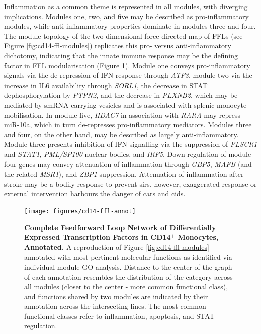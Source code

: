Inflammation as a common theme is represented in all modules, with diverging implications. Modules one, two, and five may be described as pro-inflammatory modules, while anti-inflammatory properties dominate in modules three and four. The module topology of the two-dimensional force-directed map of FFLs (see Figure \ref{fig:cd14-ffl-modules}) replicates this pro- versus anti-inflammatory dichotomy, indicating that the innate immune response may be the defining factor in FFL modularisation (Figure \ref{fig:cd14-ffl-annot}). Module one conveys pro-inflammatory signals via the de-repression of IFN response through \emph{ATF3}, module two via the increase in IL6 availability through \emph{SORL1}, the decrease in STAT dephosphorylation by \emph{PTPN2}, and the decrease in \emph{PLXNB2}, which may be mediated by smRNA-carrying vesicles and is associated with splenic monocyte mobilisation. In module five, \emph{HDAC7} in association with \emph{RARA} may repress miR-10a, which in turn de-represses pro-inflammatory mediators. Modules three and four, on the other hand, may be described as largely anti-inflammatory. Module three presents inhibition of IFN signalling via the suppression of \emph{PLSCR1} and \emph{STAT1}, \emph{PML/SP100} nuclear bodies, and \emph{IRF5}. Down-regulation of module four genes may convey attenuation of inflammation through \emph{GBP5}, \emph{MAFB} (and the related \emph{MSR1}), and \emph{ZBP1} suppression. Attenuation of inflammation after stroke may be a bodily response to prevent \acf{sirs}, however, exaggerated response or external intervention harbours the danger of \acf{cars} and \acf{cids}.

\begin{figure}
\texttt{[image: figures/cd14-ffl-annot]}
\caption[Complete Feedforward Loop Network of Differentially Expressed Transcription Factors in CD14$^+$ Monocytes, Annotated.]{\textbf{Complete Feedforward Loop Network of Differentially Expressed Transcription Factors in CD14$^+$ Monocytes, Annotated.}  A reproduction of Figure \ref{fig:cd14-ffl-modules} annotated with most pertinent molecular functions as identified via individual module GO analysis. Distance to the center of the graph of each annotation resembles the distribution of the category across all modules (closer to the center - more common functional class), and functions shared by two modules are indicated by their annotation across the intersecting lines. The most common functional classes refer to inflammation, apoptosis, and STAT regulation.
\label{fig:cd14-ffl-annot}}
\end{figure}

